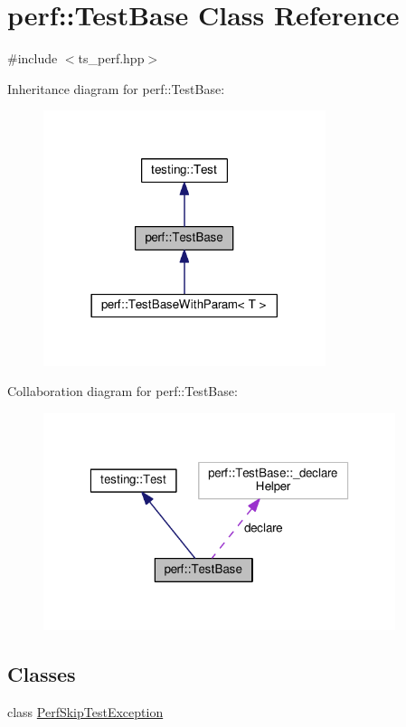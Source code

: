 \hypertarget{classperf_1_1TestBase}{\section{perf\-:\-:Test\-Base Class Reference}
\label{classperf_1_1TestBase}
}


{\ttfamily \#include $<$ts\-\_\-perf.\-hpp$>$}



Inheritance diagram for perf\-:\-:Test\-Base\-:\nopagebreak
\begin{figure}[H]
\begin{center}
\leavevmode
\includegraphics[width=234pt]{classperf_1_1TestBase__inherit__graph}
\end{center}
\end{figure}


Collaboration diagram for perf\-:\-:Test\-Base\-:\nopagebreak
\begin{figure}[H]
\begin{center}
\leavevmode
\includegraphics[width=292pt]{classperf_1_1TestBase__coll__graph}
\end{center}
\end{figure}
\subsection*{Classes}
\begin{DoxyCompactItemize}
\item 
class \hyperlink{classperf_1_1TestBase_1_1PerfSkipTestException}{Perf\-Skip\-Test\-Exception}
\end{DoxyCompactItemize}
